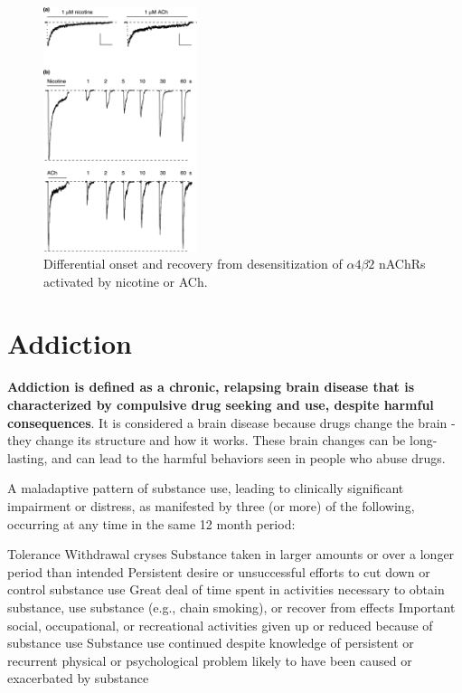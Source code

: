 \documentclass{book}
\begin{document}
\begin{figure}
    \centering
    \includegraphics[width=0.4\textwidth]{images3/image6.png}
    \caption{\label{fig:nic}Differential onset and recovery from desensitization of $\alpha 4 \beta 2$ nAChRs activated by nicotine or ACh.}
\end{figure}


\section{Addiction}
\textbf{Addiction is defined as a chronic, relapsing brain disease that is characterized by compulsive drug seeking and use, despite harmful consequences}.
It is considered a brain disease because drugs change the brain - they change its structure and how it works. 
These brain changes can be long-lasting, and can lead to the harmful behaviors seen in people who abuse drugs.

A maladaptive pattern of substance use, leading to clinically significant impairment or distress, as manifested by three (or more) of the following, occurring at any time in the same 12 month period:

Tolerance
Withdrawal cryses
Substance taken in larger amounts or over a longer period than intended
Persistent desire or unsuccessful efforts to cut down or control substance use
Great deal of time spent in activities necessary to obtain substance, use substance
(e.g., chain smoking), or recover from effects
Important social, occupational, or recreational activities given up or reduced
because of substance use
Substance use continued despite knowledge of persistent or recurrent physical or
psychological problem likely to have been caused or exacerbated by substance





\printbibliography
\end{document}
